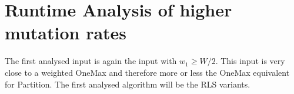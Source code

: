 



\section{Runtime Analysis of higher mutation rates}

The first analysed input is again the input with $w_1\ge W/2$.
This input is very close to a weighted OneMax and therefore more or less the OneMax equivalent for Partition.
The first analysed algorithm will be the RLS variants.

